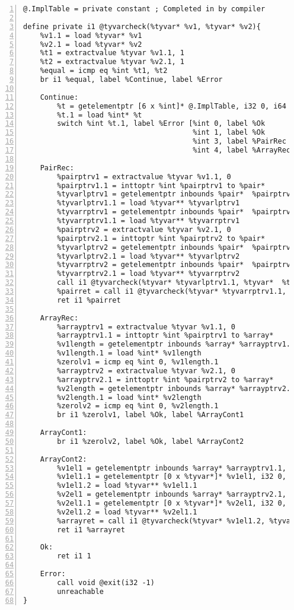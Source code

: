 \begin{lstlisting}[frame=single,numbers=left, language={[x86masm]Assembler}, caption={[LLVM tyvarcheck]LLVM IR for the typevarcheck function.},
label=lst:tyvarcheck]
@.ImplTable = private constant ; Completed in by compiler

define private i1 @tyvarcheck(%tyvar* %v1, %tyvar* %v2){
	%v1.1 = load %tyvar* %v1
	%v2.1 = load %tyvar* %v2
	%t1 = extractvalue %tyvar %v1.1, 1
	%t2 = extractvalue %tyvar %v2.1, 1
	%equal = icmp eq %int %t1, %t2
	br i1 %equal, label %Continue, label %Error

	Continue:
		%t = getelementptr [6 x %int]* @.ImplTable, i32 0, i64 %t1
		%t.1 = load %int* %t
		switch %int %t.1, label %Error [%int 0, label %Ok
										%int 1, label %Ok
									 	%int 3, label %PairRec
									 	%int 4, label %ArrayRec]

	PairRec:
		%pairptrv1 = extractvalue %tyvar %v1.1, 0
		%pairptrv1.1 = inttoptr %int %pairptrv1 to %pair*
		%tyvarlptrv1 = getelementptr inbounds %pair*  %pairptrv1.1, i32 0, i32 0
		%tyvarlptrv1.1 = load %tyvar** %tyvarlptrv1
		%tyvarrptrv1 = getelementptr inbounds %pair*  %pairptrv1.1, i32 0, i32 0
		%tyvarrptrv1.1 = load %tyvar** %tyvarrptrv1
		%pairptrv2 = extractvalue %tyvar %v2.1, 0
		%pairptrv2.1 = inttoptr %int %pairptrv2 to %pair*
		%tyvarlptrv2 = getelementptr inbounds %pair*  %pairptrv2.1, i32 0, i32 0
		%tyvarlptrv2.1 = load %tyvar** %tyvarlptrv2
		%tyvarrptrv2 = getelementptr inbounds %pair*  %pairptrv2.1, i32 0, i32 0
		%tyvarrptrv2.1 = load %tyvar** %tyvarrptrv2
		call i1 @tyvarcheck(%tyvar* %tyvarlptrv1.1, %tyvar*  %tyvarlptrv2.1)
		%pairret = call i1 @tyvarcheck(%tyvar* %tyvarrptrv1.1, %tyvar*  %tyvarrptrv2.1)
		ret i1 %pairret

	ArrayRec:
		%arrayptrv1 = extractvalue %tyvar %v1.1, 0
		%arrayptrv1.1 = inttoptr %int %pairptrv1 to %array*
		%v1length = getelementptr inbounds %array* %arrayptrv1.1, i32 0, i32 0
		%v1length.1 = load %int* %v1length
		%zerolv1 = icmp eq %int 0, %v1length.1
		%arrayptrv2 = extractvalue %tyvar %v2.1, 0
		%arrayptrv2.1 = inttoptr %int %pairptrv2 to %array*
		%v2length = getelementptr inbounds %array* %arrayptrv2.1, i32 0, i32 0
		%v2length.1 = load %int* %v2length
		%zerolv2 = icmp eq %int 0, %v2length.1
		br i1 %zerolv1, label %Ok, label %ArrayCont1

	ArrayCont1:
		br i1 %zerolv2, label %Ok, label %ArrayCont2

	ArrayCont2:
		%v1el1 = getelementptr inbounds %array* %arrayptrv1.1, i32 0, i32 1
		%v1el1.1 = getelementptr [0 x %tyvar*]* %v1el1, i32 0, i32 0
		%v1el1.2 = load %tyvar** %v1el1.1
		%v2el1 = getelementptr inbounds %array* %arrayptrv2.1, i32 0, i32 1
		%v2el1.1 = getelementptr [0 x %tyvar*]* %v2el1, i32 0, i32 0
		%v2el1.2 = load %tyvar** %v2el1.1
		%arrayret = call i1 @tyvarcheck(%tyvar* %v1el1.2, %tyvar* %v2el1.2)
		ret i1 %arrayret

	Ok:
		ret i1 1

	Error:
		call void @exit(i32 -1)
  		unreachable
}\end{lstlisting}
